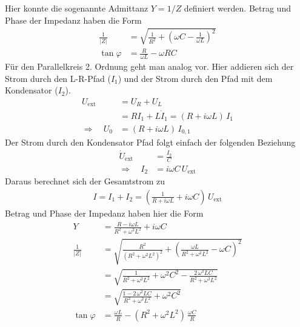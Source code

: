 Hier konnte die sogenannte Admittanz $Y=1/Z$ definiert werden. Betrag und Phase der Impedanz haben die Form
\begin{align*}
    \frac{1}{|Z|}&=\sqrt{\frac{1}{R^2}+\left( \omega C- \frac{1}{\omega L} \right)^2}\\
    \tan\varphi&=\frac{R}{\omega L}-\omega RC
\end{align*}
Für den Parallelkreis 2. Ordnung geht man analog vor. Hier addieren sich der Strom durch den L-R-Pfad ($I_1$) und der Strom durch den Pfad mit dem Kondensator ($I_2$). 
\begin{align*}
    U_\text{ext}&=U_R+U_L\\
    &=RI_1+L\dot{I}_1=\left( R+i\omega L \right)\,I_1\\
    \Rightarrow\quad U_0&=\left( R+i\omega L \right)\,I_{0,1}
\end{align*}
Der Strom durch den Kondensator Pfad folgt einfach der folgenden Beziehung
\begin{align*}
    \dot{U}_\text{ext}&=\frac{I_2}{C}\\
    \Rightarrow\quad I_2&=i\omega C\,U_\text{ext}
\end{align*}
Daraus berechnet sich der Gesamtstrom zu
\begin{align*}
    I=I_1+I_2=\left( \frac{1}{R+i\omega L}+i\omega C \right)\,U_\text{ext}
\end{align*}
Betrag und Phase der Impedanz haben hier die Form
\begin{align*}
    Y&=\frac{R-i\omega L}{{R^2+\omega^2L^2}}+i\omega C\\
    \frac{1}{|Z|}&=\sqrt{\frac{R^2}{(R^2+\omega^2L^2)^2}+\left( \frac{\omega L}{{R^2+\omega^2L^2}}-\omega C \right)^2}\\
    &=\sqrt{\frac{1}{R^2+\omega^2L^2}+\omega^2C^2-\frac{2\,\omega^2 LC}{{R^2+\omega^2L^2}}}\\
    &=\sqrt{\frac{1-2\,\omega^2 LC}{R^2+\omega^2L^2}+\omega^2C^2}\\
    \tan\varphi&=\frac{\omega L}{R}-\left(R^2+\omega^2L^2\right)\,\frac{\omega C}{R}
\end{align*}